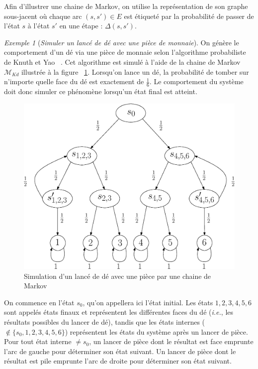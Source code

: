 \documentclass[12pt,a4paper]{report}
\theoremstyle{definition}
\theoremstyle{remark}
\newtheorem{example}{Exemple}[chapter]
\newcommand{\ie}{\textit{i.e.}, }
\let\labelitemi\labelitemii
\begin{document}
Afin d'illustrer une chaine de Markov, on utilise la représentation de son graphe sous-jacent où 
chaque arc $(s, s') \in E$ est étiqueté par la probabilité de passer de l'état $s$ à l'état $s'$ en une étape : $\Delta(s, s')$.

\begin{example} [\textit{Simuler un lancé de dé avec une pièce de monnaie}] \label{knuthdie}
	On génère le comportement d'un dé via une pièce de monnaie selon l'algorithme probabiliste de Knuth et Yao ~\cite{KY76}. Cet algorithme est simulé à l'aide de la chaine de Markov $\mathcal{M}_{Kd}$ illustrée à la figure ~\ref{diebyacoin}. Lorsqu'on lance un dé, la probabilité de tomber sur n'importe quelle face du dé est exactement de $\frac{1}{6}$. Le comportement du système doit donc simuler ce phénomène lorsqu'un état final est atteint.
	\begin{figure}[H]
		\centering
		\includegraphics[scale=0.5]{figures/dieByaCoin.eps}
		\caption{Simulation d'un lancé de dé avec une pièce par une chaine de Markov}
		\label{diebyacoin}
	\end{figure}
	On commence en l'état $s_0$, qu'on appellera ici l'état initial. Les états $1, 2, 3, 4, 5, 6$ sont appelés états finaux et représentent les différentes faces du dé (\ie les résultats possibles du lancer de dé), tandis que les états internes ($\notin \{s_0, 1, 2, 3, 4, 5, 6\}$) représentent les états du système après un lancer de pièce. Pour tout état interne $\neq s_0$, un lancer de pièce dont le résultat est face emprunte l'arc de gauche pour déterminer son état suivant. Un lancer de pièce dont le résultat est pile emprunte l'arc de droite pour déterminer son état suivant.\\
	

\end{example}
\end{document}
